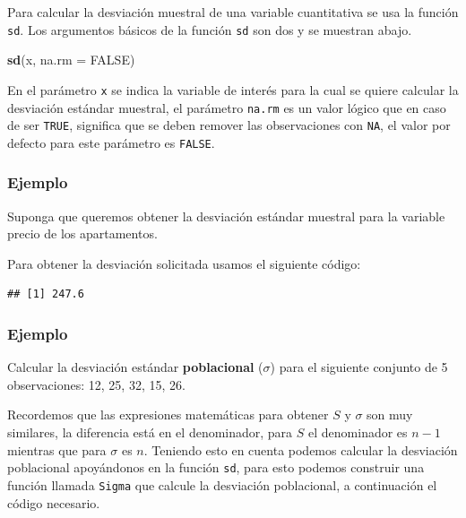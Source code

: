 \documentclass[10pt,]{krantz}
\makeatletter
\newenvironment{Shaded}{\begin{snugshade}}{\end{snugshade}}
\newcommand{\KeywordTok}[1]{\textcolor[rgb]{0.13,0.29,0.53}{\textbf{#1}}}
\newcommand{\DataTypeTok}[1]{\textcolor[rgb]{0.13,0.29,0.53}{#1}}
\newcommand{\OtherTok}[1]{\textcolor[rgb]{0.56,0.35,0.01}{#1}}
\newcommand{\OperatorTok}[1]{\textcolor[rgb]{0.81,0.36,0.00}{\textbf{#1}}}
\newcommand{\NormalTok}[1]{#1}
\newenvironment{kframe}{%
\medskip{}
\setlength{\fboxsep}{.8em}
 \def\at@end@of@kframe{}%
 \ifinner\ifhmode%
  \def\at@end@of@kframe{\end{minipage}}%
  \begin{minipage}{\columnwidth}%
 \fi\fi%
 \def\FrameCommand##1{\hskip\@totalleftmargin \hskip-\fboxsep
 \colorbox{shadecolor}{##1}\hskip-\fboxsep
     \hskip-\linewidth \hskip-\@totalleftmargin \hskip\columnwidth}%
 \MakeFramed {\advance\hsize-\width
   \@totalleftmargin\z@ \linewidth\hsize
   \@setminipage}}%
 {\par\unskip\endMakeFramed%
 \at@end@of@kframe}
\renewenvironment{Shaded}{\begin{kframe}}{\end{kframe}}
\makeatother
\begin{document}
Para calcular la desviación muestral de una variable cuantitativa se usa
la función \texttt{sd}. Los argumentos básicos de la función \texttt{sd}
son dos y se muestran abajo.

\begin{Shaded}
\begin{Highlighting}[]
\KeywordTok{sd}\NormalTok{(x, }\DataTypeTok{na.rm =} \OtherTok{FALSE}\NormalTok{)}
\end{Highlighting}
\end{Shaded}

En el parámetro \texttt{x} se indica la variable de interés para la cual
se quiere calcular la desviación estándar muestral, el parámetro
\texttt{na.rm} es un valor lógico que en caso de ser \texttt{TRUE},
significa que se deben remover las observaciones con \texttt{NA}, el
valor por defecto para este parámetro es \texttt{FALSE}.

\subsubsection*{Ejemplo}\label{ejemplo-22}

Suponga que queremos obtener la desviación estándar muestral para la
variable precio de los apartamentos.

Para obtener la desviación solicitada usamos el siguiente código:

\begin{Shaded}
\end{Shaded}

\begin{verbatim}
## [1] 247.6
\end{verbatim}

\subsubsection*{Ejemplo}\label{ejemplo-23}

Calcular la desviación estándar \textbf{poblacional} (\(\sigma\)) para
el siguiente conjunto de 5 observaciones: 12, 25, 32, 15, 26.

Recordemos que las expresiones matemáticas para obtener \(S\) y
\(\sigma\) son muy similares, la diferencia está en el denominador, para
\(S\) el denominador es \(n-1\) mientras que para \(\sigma\) es \(n\).
Teniendo esto en cuenta podemos calcular la desviación poblacional
apoyándonos en la función \texttt{sd}, para esto podemos construir una
función llamada \texttt{Sigma} que calcule la desviación poblacional, a
continuación el código necesario.
\end{document}
